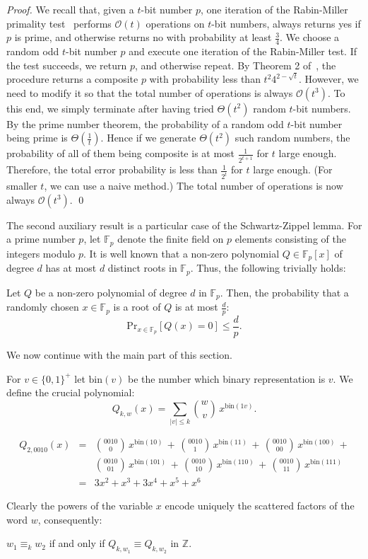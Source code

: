 \documentclass[runningheads]{llncs}
\newcommand{\bigo}{{\mathcal{O}}}
\begin{document}
\begin{proof}
We recall that, given a $t$-bit number $p$, one iteration of the Rabin-Miller primality test~\cite{RM} performs $\bigo(t)$ operations on $t$-bit numbers, always returns yes if $p$ is prime, and otherwise returns no with probability at least $\frac{3}{4}$. We choose a random odd $t$-bit number $p$ and execute one iteration of the Rabin-Miller test. If the test succeeds, we return $p$, and otherwise repeat. By Theorem 2 of~\cite{Pomerance}, the procedure returns a composite $p$ with probability less than $t^{2}4^{2-\sqrt{t}}$. However, we need to modify it so that the total number of operations is always $\bigo(t^{3})$.
To this end, we simply terminate after having tried $\Theta(t^{2})$ random $t$-bit numbers.
By the prime number theorem, the probability of a random odd $t$-bit number being prime is $\Theta(\frac{1}{t})$. Hence if we generate $\Theta(t^{2})$ such random numbers, the probability of all of them being composite is at most $\frac{1}{2^{t+1}}$ for $t$ large enough. Therefore, the total error probability is less than $\frac{1}{2^{t}}$ for $t$ large enough. (For smaller $t$, we can use a naive method.) The total number of operations is now always $\bigo(t^{3})$.
\qed
\end{proof}

The second auxiliary result is a particular case of the Schwartz-Zippel lemma. For a prime number $p$, let $\mathbb{F}_p$ denote the finite field on $p$ elements consisting of the integers modulo $p$. It is well known that a non-zero polynomial $Q\in \mathbb{F}_p[x]$ of degree $d$ has at most $d$ distinct roots in $\mathbb{F}_p$. Thus, the following trivially holds:
\begin{lemma}\label{SZ}
Let $Q$ be a non-zero polynomial of degree $d$ in $\mathbb{F}_p$. Then, the probability that a randomly chosen $x \in \mathbb{F}_p$ is a root of $Q$ is at most $\frac{d}{p}$:
$$\mathrm{Pr}_{x\in \mathbb{F}_p}[Q(x)=0] \leq \frac{d}{p}.$$ 
\end{lemma}

We now continue with the main part of this section.

For $v \in \{0,1\}^+$ let $\mathrm{bin}(v)$ be the number which binary representation is $v$. We define the crucial polynomial:
$$Q_{k,w}(x)=\sum_{|v|\le k} {w\choose v}\, x^{\mathrm{bin}(1v)}.$$
\begin{example}
\begin{eqnarray*}
Q_{2,0010}(x)&=&{0010\choose 0}\, x^{\mathrm{bin}(10)}\,+\, {0010\choose 1}\, x^{\mathrm{bin}(11)} \,+\, {0010\choose 00}\, x^{\mathrm{bin}(100)}\, + \\ 
& & {0010\choose 01}\, x^{\mathrm{bin}(101)}\,+\, {0010\choose 10}\, x^{\mathrm{bin}(110)}\,+\, {0010\choose 11}\, x^{\mathrm{bin}(111)}\\
&=& 3x^2+x^3+3x^4+x^5+x^6
\end{eqnarray*}
\end{example}
Clearly the powers of the variable $x$ encode uniquely the scattered factors of the word $w$, consequently:
\begin{observation}
$w_1\equiv_k w_2$ if and only if $Q_{k,w_1}\equiv Q_{k,w_2}$ in $\mathbb{Z}$.
\end{observation}
\end{document}
